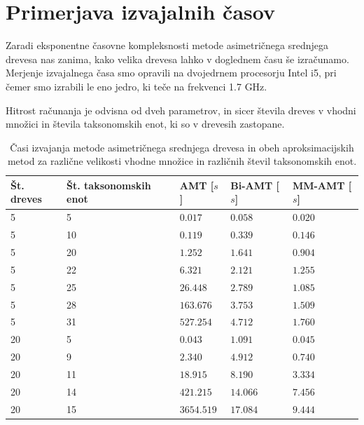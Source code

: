 \documentclass[a4paper, 12pt]{book}
\begin{document}
\section{Primerjava izvajalnih časov}
Zaradi eksponentne časovne kompleksnosti metode asimetričnega srednjega drevesa nas zanima, kako velika drevesa lahko v doglednem
času še izračunamo. Merjenje izvajalnega časa smo opravili na dvojedrnem procesorju Intel i5, pri čemer smo izrabili le eno jedro, 
ki teče na frekvenci 1.7 GHz.

Hitrost računanja je odvisna od dveh parametrov, in sicer števila dreves v vhodni množici in števila taksonomskih enot, ki so v
drevesih zastopane.
 
\begin{table}[h!]
	\begin{center}
	{\footnotesize
	\begin{tabular}{ l| l | l | l | l }
	Št. dreves       & Št. taksonomskih enot & AMT [$s$] & Bi-AMT [$s$] & MM-AMT [$s$] \\ \hline
	5                & 5                     & $0.017$   & $0.058$      & $0.020$      \\ \hline
	5                & 10                    & $0.119$   & $0.339$      & $0.146$      \\ \hline
	5                & 20                    & $1.252$   & $1.641$      & $0.904$      \\ \hline
	5                & 22                    & $6.321$   & $2.121$      & $1.255$      \\ \hline
	5                & 25                    & $26.448$  & $2.789$      & $1.085$      \\ \hline
	5                & 28                    & $163.676$ & $3.753$      & $1.509$      \\ \hline
	5                & 31                    & $527.254$ & $4.712$      & $1.760$      \\ \hline
	20               & 5                     & $0.043$   & $1.091$      & $0.045$      \\ \hline
	20               & 9                     & $2.340$   & $4.912$      & $0.740$      \\ \hline
	20               & 11                    & $18.915$  & $8.190$      & $3.334$      \\ \hline
	20               & 14                    & $421.215$ & $14.066$     & $7.456$      \\ \hline
	20               & 15                    & $3654.519$ & $17.084$    & $9.444$      \\ \hline
	\end{tabular}
	\caption{
	  Časi izvajanja metode asimetričnega srednjega drevesa in obeh aproksimacijskih metod za različne velikosti vhodne množice 
	  in različnih števil taksonomskih enot.
	 }
	}
	\label{table-timing-1}
	\end{center}		
\end{table}
\end{document}
